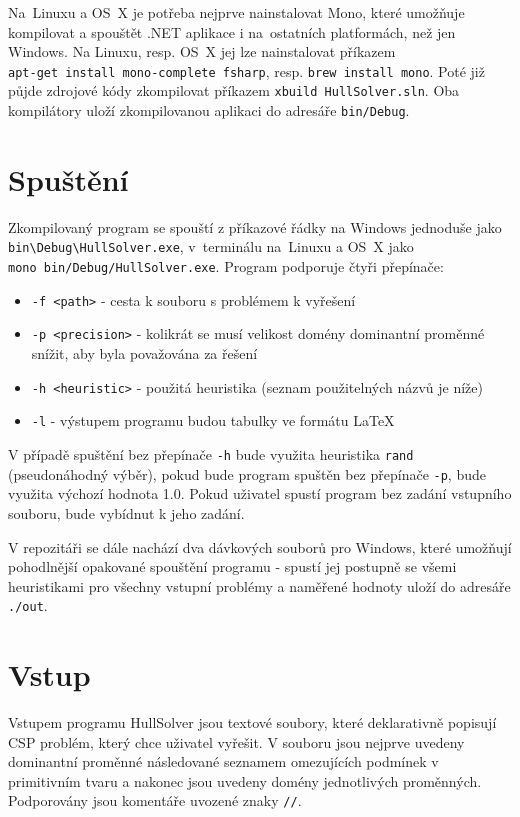 \documentclass[thesis=B,czech]{FITthesis}[2012/06/26]
\theoremstyle{definition}
\begin{document}
Na~Linuxu a OS~X je potřeba nejprve nainstalovat Mono, které umožňuje kompilovat a spouštět .NET aplikace i na~ostatních platformách, než jen Windows. Na Linuxu, resp. OS~X jej lze nainstalovat příkazem \\ \verb|apt-get install mono-complete fsharp|, resp. \verb|brew install mono|. Poté již půjde zdrojové kódy zkompilovat příkazem \verb|xbuild HullSolver.sln|. Oba kompilátory uloží zkompilovanou aplikaci do adresáře \verb|bin/Debug|.

\section{Spuštění}

Zkompilovaný program se spouští z příkazové řádky na Windows jednoduše jako \verb|bin\Debug\HullSolver.exe|, v~terminálu na~Linuxu a OS~X jako \\ \verb|mono bin/Debug/HullSolver.exe|. Program podporuje čtyři přepínače:

\begin{itemize}
    \item \verb|-f <path>| - cesta k souboru s problémem k vyřešení
    \item \verb|-p <precision>| - kolikrát se musí velikost domény dominantní proměnné snížit, aby byla považována za řešení
    \item \verb|-h <heuristic>| - použitá heuristika (seznam použitelných názvů je níže)
    \item \verb|-l| - výstupem programu budou tabulky ve formátu \LaTeX
\end{itemize}

V případě spuštění bez přepínače \verb|-h| bude využita heuristika \verb|rand| (pseudonáhodný výběr), pokud bude program spuštěn bez přepínače \verb|-p|, bude využita výchozí hodnota 1.0. Pokud uživatel spustí program bez zadání vstupního souboru, bude vybídnut k jeho zadání.

V repozitáři se dále nachází dva dávkových souborů pro Windows, které umožňují pohodlnější opakované spouštění programu - spustí jej postupně se všemi heuristikami pro všechny vstupní problémy a naměřené hodnoty uloží do adresáře \verb|./out|.

\section{Vstup}
Vstupem programu HullSolver jsou textové soubory, které deklarativně popisují CSP problém, který chce uživatel vyřešit. V souboru jsou nejprve uvedeny dominantní proměnné následované seznamem omezujících podmínek v primitivním tvaru a nakonec jsou uvedeny domény jednotlivých proměnných. Podporovány jsou komentáře uvozené znaky \verb|//|.
\end{document}
